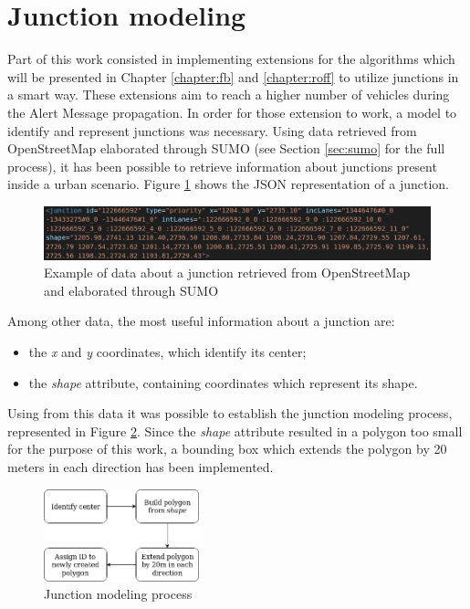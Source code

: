 	\section{Junction modeling}
		\label{sec:junction-modeling}
		Part of this work consisted in implementing extensions for the algorithms which will be presented in Chapter \ref{chapter:fb} and \ref{chapter:roff} to utilize junctions in a smart way. These extensions aim to reach a higher number of vehicles during the Alert Message propagation. In order for those extension to work, a model to identify and represent junctions was necessary. Using data retrieved from OpenStreetMap elaborated through SUMO (see Section \ref{sec:sumo} for the full process), it has been possible to retrieve information about junctions present inside a urban scenario. Figure \ref{fig:junction} shows the JSON representation of a junction.
		
		\begin{figure}[H]
			\centering
			\includegraphics[width=\textwidth]{immagini/junction}
			\caption{Example of data about a junction retrieved from OpenStreetMap and elaborated through SUMO}
			\label{fig:junction}
		\end{figure}
		
		Among other data, the most useful information about a junction are:
		\begin{itemize}
			\item the \textit{x} and \textit{y} coordinates, which identify its center;
			\item the \textit{shape} attribute, containing coordinates which represent its shape.
		\end{itemize}
		
		Using from this data it was possible to establish the junction modeling process, represented in Figure \ref{fig:junction-process}. Since the \textit{shape} attribute resulted in a polygon too small for the purpose of this work, a bounding box which extends the polygon by 20 meters in each direction has been implemented.
		
		\begin{figure}[H]
			\centering
			\includegraphics[width=0.4\textwidth]{immagini/junction-process}
			\caption{Junction modeling process}
			\label{fig:junction-process}
		\end{figure}
	
